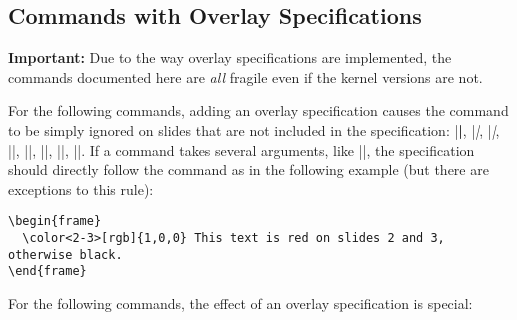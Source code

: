 \subsection{Commands with Overlay Specifications}
\label{section-overlay-commands}

\textbf{Important:} Due to the way overlay specifications are implemented, the
commands documented here are \emph{all} fragile even if the \LaTeXe{} kernel
versions are not.

For the following commands, adding an overlay specification causes the command to be simply ignored on slides that are not included in the specification: |\textbf|, |\textit|, |\textsl|, |\textrm|, |\textsf|, |\color|, |\alert|, |\structure|. If a command takes several arguments, like |\color|, the specification should directly follow the command as in the following example (but there are exceptions to this rule):
\begin{verbatim}
\begin{frame}
  \color<2-3>[rgb]{1,0,0} This text is red on slides 2 and 3, otherwise black.
\end{frame}
\end{verbatim}

For the following commands, the effect of an overlay specification is special:


